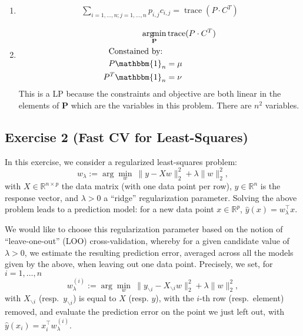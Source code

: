 \documentclass[11pt]{article}
\DeclareMathOperator*{\argmin}{arg\!min}
\DeclareMathOperator*{\trace}{trace}
\begin{document}
\begin{solution}
\begin{enumerate}
\item
    \begin{align*}
    \sum_{i=1,\dots,n ; j=1,\dots,n} p_{i,j} c_{i,j} = \trace(P \cdot C^T)
    \end{align*}

\item
    \begin{align*}
	\argmin_{\mathbf{P}} &\trace(P \cdot C^T) \\
	\text{Constained by: }& \\
	P \mathbbm{1}_n &= \mu \\
	P^T \mathbbm{1}_n &= \nu
    \end{align*}
    This is a LP because the constraints and objective are both linear in the elements of $\mathbf{P}$ which are the variables in this problem. There are $n^2$ variables.
\end{enumerate}
\end{solution}

\newpage
\subsection*{Exercise 2 (Fast CV for Least-Squares)}

In this exercise, we consider a regularized least-squares problem:
\begin{equation}\label{eq:rls}
w_\lambda :=\arg\min_w \: \|y-Xw\|_2^2 + \lambda \|w\|_2^2,
\end{equation}
with $X \in \mathbb{R}^{n \times p}$ the data matrix (with one data point per row), $y \in \mathbb{R}^n$ is the response vector, and $\lambda>0$ a ``ridge'' regularization parameter. Solving the above problem leads to a prediction model: for a new data point $x \in \mathbb{R}^{p}$, $\hat{y}(x) = w_\lambda^\top x$.

We would like to choose this regularization parameter based on the notion of ``leave-one-out''  (LOO) cross-validation, whereby for a given candidate value of $\lambda>0$, we estimate the resulting prediction error, averaged across all the models given by the above, when leaving out one data point. Precisely, we set, for $i=1,\ldots,n$
\[
w^{(i)}_\lambda := \arg\min_w \: \|y_{\backslash i}-X_{\backslash i}w\|_2^2 + \lambda \|w\|_2^2,
\]
with $X_{\backslash i}$ (resp.\ $y_{\backslash i}$) is equal to $X$ (resp. $y$), with the $i$-th row (resp.\ element) removed, and evaluate the prediction error on the point we just left out, with $\hat{y}(x_i) = x_i^\top w^{(i)}_\lambda$.
\end{document}
